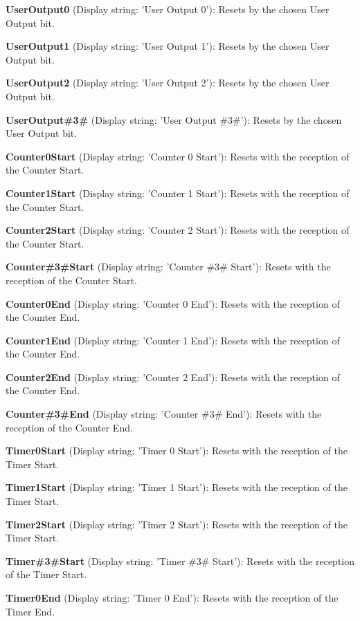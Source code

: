 \begin{DoxyItemize}
\item {\bfseries User\+Output0} (Display string\+: 'User Output 0')\+: Resets by the chosen User Output bit.
\item {\bfseries User\+Output1} (Display string\+: 'User Output 1')\+: Resets by the chosen User Output bit.
\item {\bfseries User\+Output2} (Display string\+: 'User Output 2')\+: Resets by the chosen User Output bit.
\item {\bfseries User\+Output\#3\#} (Display string\+: 'User Output \#3\#')\+: Resets by the chosen User Output bit.
\item {\bfseries Counter0\+Start} (Display string\+: 'Counter 0 Start')\+: Resets with the reception of the Counter Start.
\item {\bfseries Counter1\+Start} (Display string\+: 'Counter 1 Start')\+: Resets with the reception of the Counter Start.
\item {\bfseries Counter2\+Start} (Display string\+: 'Counter 2 Start')\+: Resets with the reception of the Counter Start.
\item {\bfseries Counter\#3\#Start} (Display string\+: 'Counter \#3\# Start')\+: Resets with the reception of the Counter Start.
\item {\bfseries Counter0\+End} (Display string\+: 'Counter 0 End')\+: Resets with the reception of the Counter End.
\item {\bfseries Counter1\+End} (Display string\+: 'Counter 1 End')\+: Resets with the reception of the Counter End.
\item {\bfseries Counter2\+End} (Display string\+: 'Counter 2 End')\+: Resets with the reception of the Counter End.
\item {\bfseries Counter\#3\#End} (Display string\+: 'Counter \#3\# End')\+: Resets with the reception of the Counter End.
\item {\bfseries Timer0\+Start} (Display string\+: 'Timer 0 Start')\+: Resets with the reception of the Timer Start.
\item {\bfseries Timer1\+Start} (Display string\+: 'Timer 1 Start')\+: Resets with the reception of the Timer Start.
\item {\bfseries Timer2\+Start} (Display string\+: 'Timer 2 Start')\+: Resets with the reception of the Timer Start.
\item {\bfseries Timer\#3\#Start} (Display string\+: 'Timer \#3\# Start')\+: Resets with the reception of the Timer Start.
\item {\bfseries Timer0\+End} (Display string\+: 'Timer 0 End')\+: Resets with the reception of the Timer End.

\end{DoxyItemize}

